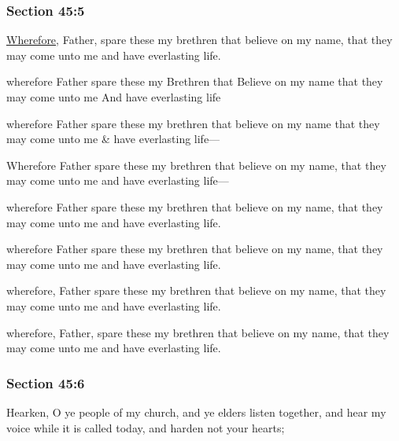 	\subsubsection{Section 45:5} %
		\label{DC45-5}
		
		\hyperref[WHEREFORE]{Wherefore}, Father, spare these my brethren that believe on my name, that they may come unto me and have everlasting life.
		
		\begin{framed}
		\scriptsize
			\begin{compactdesc}
				\item[JSP] wherefore Father spare these my Brethren that Believe on my name that they may come unto me And have everlasting life
				\item[Partridge] wherefore Father spare these my brethren that believe on my name that they may come unto me \& have everlasting life---
				\item[McLellin] Wherefore Father spare these my brethren that believe on my name, that they may come unto me and have everlasting life---
				\item[EMS] wherefore Father spare these my brethren that believe on my name, that they may come unto me and have everlasting life.
				\item[BC] wherefore Father spare these my brethren that believe on my name, that they may come unto me and have everlasting life.
				\item[DC 1835] wherefore, Father spare these my brethren that believe on my name, that they may come unto me and have everlasting life.
				\item[DC 1844] wherefore, Father, spare these my brethren that believe on my name, that they may come unto me and have everlasting life.
			\end{compactdesc}
		\end{framed}

	\subsubsection{Section 45:6} %
		\label{DC45-6}

		Hearken, O ye people of my church, and ye elders listen together, and hear my voice while it is called today, and harden not your hearts;


